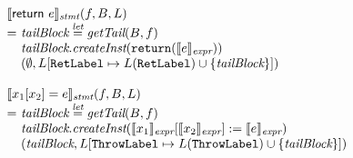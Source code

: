 \[\begin{array}{l@{}l@{~}l}
\lefteqn{\transfun{\ircfgreturn{e}}_{\emph{stmt}}(f, B, L)}\\
& = & \emph{tailBlock} \letval \getTail(B, f)\\
& & \emph{tailBlock}.\emph{createInst}(\TT{return}(\transfun{e}_{\emph{expr}}))\\
& & (\emptyset, L[\RetLabel \mapsto L(\RetLabel) \cup \{ \emph{tailBlock}\}])\\
& & \\

\lefteqn{\transfun{\irstore{x_1}{x_2}{e}}_{\emph{stmt}}(f, B, L)}\\
& = & \emph{tailBlock} \letval \getTail(B, f)\\
& & \emph{tailBlock}.\emph{createInst}(\transfun{x_1}_{\emph{expr}}[\transfun{x_2}_{\emph{expr}}] := \transfun{e}_{\emph{expr}})\\
& & (\emph{tailBlock}, L[\ThrowLabel \mapsto L(\ThrowLabel) \cup \{ \emph{tailBlock} \}])\\
\end{array}
\]

